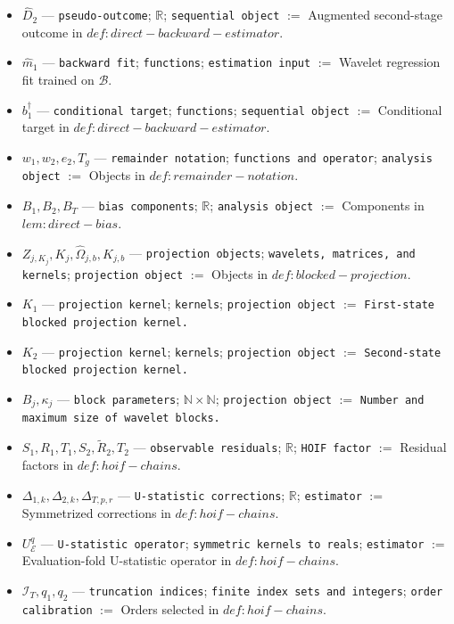 \documentclass{article}
\begin{document}
\begin{itemize}
  \item \(\widehat D_2\) --- \texttt{pseudo-outcome}; \(\mathbb R\); \texttt{sequential object} $:=$ Augmented second-stage outcome in \(def:direct-backward-estimator\).
  \item \(\widehat m_1\) --- \texttt{backward fit}; \texttt{functions}; \texttt{estimation input} $:=$ Wavelet regression fit trained on \(\mathcal B\).
  \item \(b_1^\dagger\) --- \texttt{conditional target}; \texttt{functions}; \texttt{sequential object} $:=$ Conditional target in \(def:direct-backward-estimator\).
  \item \(w_1,w_2,e_2,T_g\) --- \texttt{remainder notation}; \texttt{functions and operator}; \texttt{analysis object} $:=$ Objects in \(def:remainder-notation\).
  \item \(B_1,B_2,B_T\) --- \texttt{bias components}; \(\mathbb R\); \texttt{analysis object} $:=$ Components in \(lem:direct-bias\).
  \item \(Z_{j,K_j},K_j,\widehat\Omega_{j,b},K_{j,b}\) --- \texttt{projection objects}; \texttt{wavelets, matrices, and kernels}; \texttt{projection object} $:=$ Objects in \(def:blocked-projection\).
  \item \(K_1\) --- \texttt{projection kernel}; \texttt{kernels}; \texttt{projection object} $:=$ \texttt{First-state blocked projection kernel.}
  \item \(K_2\) --- \texttt{projection kernel}; \texttt{kernels}; \texttt{projection object} $:=$ \texttt{Second-state blocked projection kernel.}
  \item \(B_j,\kappa_j\) --- \texttt{block parameters}; \(\mathbb N\times\mathbb N\); \texttt{projection object} $:=$ \texttt{Number and maximum size of wavelet blocks.}
  \item \(S_1,R_1,T_1,S_2,\widetilde R_2,T_2\) --- \texttt{observable residuals}; \(\mathbb R\); \texttt{HOIF factor} $:=$ Residual factors in \(def:hoif-chains\).
  \item \(\Delta_{1,k},\Delta_{2,k},\Delta_{T,p,r}\) --- \texttt{U-statistic corrections}; \(\mathbb R\); \texttt{estimator} $:=$ Symmetrized corrections in \(def:hoif-chains\).
  \item \(U_{\mathcal E}^q\) --- \texttt{U-statistic operator}; \texttt{symmetric kernels to reals}; \texttt{estimator} $:=$ Evaluation-fold U-statistic operator in \(def:hoif-chains\).
  \item \(\mathcal I_T,q_1,q_2\) --- \texttt{truncation indices}; \texttt{finite index sets and integers}; \texttt{order calibration} $:=$ Orders selected in \(def:hoif-chains\).

\end{itemize}
\end{document}
